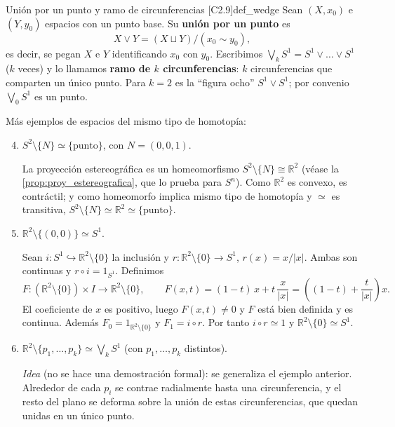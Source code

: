 \begin{definicion}{Unión por un punto y ramo de circunferencias [C2.9]}{def_wedge}
Sean $(X,x_0)$ e $(Y,y_0)$ espacios con un punto base. Su \textbf{unión por un punto} es
\[ X \vee Y = (X \sqcup Y)/(x_0 \sim y_0), \]
es decir, se pegan $X$ e $Y$ identificando $x_0$ con $y_0$. Escribimos $\bigvee_k S^1 = S^1 \vee \dots \vee S^1$ ($k$ veces) y lo llamamos \textbf{ramo de $k$ circunferencias}: $k$ circunferencias que comparten un único punto. Para $k=2$ es la ``figura ocho'' $S^1 \vee S^1$; por convenio $\bigvee_0 S^1$ es un punto.
\end{definicion}

Más ejemplos de espacios del mismo tipo de homotopía:
\begin{enumerate}
    \setcounter{enumi}{3}
    \item $S^2 \setminus \{N\} \simeq \{\text{punto}\}$, con $N = (0,0,1)$.

    La proyección estereográfica es un homeomorfismo $S^2 \setminus \{N\} \cong \mathbb{R}^2$ (véase la \cref{prop:proy_estereografica}, que lo prueba para $S^n$). Como $\mathbb{R}^2$ es convexo, es contráctil; y como homeomorfo implica mismo tipo de homotopía y $\simeq$ es transitiva, $S^2 \setminus \{N\} \simeq \mathbb{R}^2 \simeq \{\text{punto}\}$.

    \item $\mathbb{R}^2 \setminus \{(0,0)\} \simeq S^1$.

    Sean $i \colon S^1 \hookrightarrow \mathbb{R}^2 \setminus \{0\}$ la inclusión y $r \colon \mathbb{R}^2 \setminus \{0\} \to S^1$, $r(x) = x/|x|$. Ambas son continuas y $r \circ i = 1_{S^1}$. Definimos
    \[ F \colon (\mathbb{R}^2 \setminus \{0\}) \times I \to \mathbb{R}^2 \setminus \{0\}, \qquad F(x,t) = (1-t)\,x + t\,\frac{x}{|x|} = \left( (1-t) + \frac{t}{|x|} \right) x. \]
    El coeficiente de $x$ es positivo, luego $F(x,t) \neq 0$ y $F$ está bien definida y es continua. Además $F_0 = 1_{\mathbb{R}^2 \setminus \{0\}}$ y $F_1 = i \circ r$. Por tanto $i \circ r \simeq 1$ y $\mathbb{R}^2 \setminus \{0\} \simeq S^1$.

    \item $\mathbb{R}^2 \setminus \{p_1, \dots, p_k\} \simeq \bigvee_k S^1$ (con $p_1, \dots, p_k$ distintos).

    \emph{Idea} (no se hace una demostración formal): se generaliza el ejemplo anterior. Alrededor de cada $p_i$ se contrae radialmente hasta una circunferencia, y el resto del plano se deforma sobre la unión de estas circunferencias, que quedan unidas en un único punto.


\end{enumerate}
